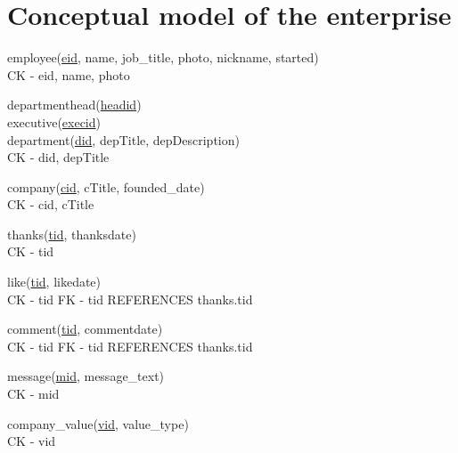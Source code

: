 \documentclass[11pt]{report}
\begin{document}
\section{Conceptual model of the enterprise}
employee(\underline{eid}, name, job\_title, photo, nickname, started) \\

    CK - eid, name, photo

departmenthead(\underline{headid}) \\

executive(\underline{execid}) \\

department(\underline{did}, depTitle, depDescription) \\

    CK - did, depTitle

company(\underline{cid}, cTitle, founded\_date) \\

    CK - cid, cTitle

thanks(\underline{tid}, thanksdate) \\

    CK - tid

like(\underline{tid}, likedate) \\

    CK - tid
    FK - tid REFERENCES thanks.tid

comment(\underline{tid}, commentdate) \\

    CK - tid
    FK - tid REFERENCES thanks.tid

message(\underline{mid}, message\_text) \\

    CK - mid

company\_value(\underline{vid}, value\_type) \\

    CK - vid
\clearpage
\end{document}
